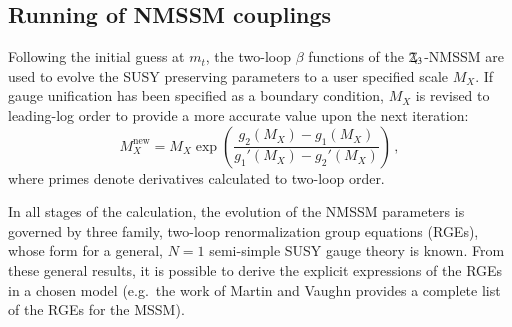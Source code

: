 \documentclass[final,3p,times]{elsarticle}
\newcommand{\Zv}{\,\mathbf{\backslash}\mkern-11.0mu{\mathbb{Z}}_{3}} %
\begin{document}
\subsection{Running of NMSSM couplings~\label{running}}
Following the initial guess at $m_t$, the two-loop $\beta$ functions of the 
$\Zv$-NMSSM are used to evolve the SUSY preserving parameters to a user 
specified scale $M_X$. If gauge unification has been specified as a boundary 
condition, $M_X$ is revised to leading-log order to provide a more accurate 
value upon the next iteration:
%
\begin{equation}
M_X^{\textrm{new}} = M_X \exp 
\left({\frac{g_2(M_X) - g_1(M_X)}{g_1'(M_X) - g_2'(M_X)}}\right)\,,
\label{mguteq}
\end{equation}
%
where primes denote derivatives calculated to two-loop order.   

In all stages of the calculation, the evolution of the NMSSM parameters is 
governed by three family, two-loop renormalization group equations (RGEs), whose
 form \cite{MV94,Yam94} for a general, $N=1$ semi-simple SUSY gauge 
theory is known. From these general results, it is possible to derive the 
explicit expressions of the RGEs in a chosen model (e.g.\ the work of Martin and
 Vaughn \cite{MV94} provides a complete list of the RGEs for the MSSM).  
\end{document}
